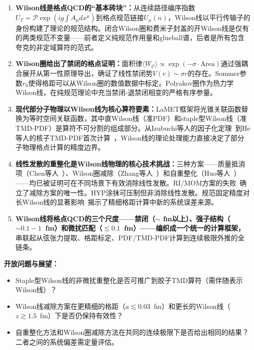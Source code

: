 \documentclass[12pt,a4paper]{ctexart}
\theoremstyle{definition}
\begin{document}
\begin{enumerate}[leftmargin=*]

    \item \textbf{Wilson线是格点QCD的``基本砖块''：}从连续路径编序指数$U_\Gamma = \mathcal{P}\exp(ig\int A_\mu dx^\mu)$到格点规范链接$U_\mu(n)$，Wilson线以平行传输子的身份构建了理论的规范结构。闭合Wilson圈和费米子封盖的开Wilson线是仅有的两类规范不变量——前者定义纯规范作用量和glueball谱，后者是所有包含夸克的非定域算符的范式。

    \item \textbf{Wilson圈给出了禁闭的格点证明：}面积律$\langle W_{\mathcal{C}}\rangle \propto \exp(-\sigma\cdot\text{Area})$通过强耦合展开从第一性原理导出，确证了线性禁闭势$V(r) \sim \sigma r$的存在。Sommer参数$r_0$使得格距可以从Wilson圈的数值数据中标定。Polyakov圈作为热力学Wilson线，在纯规范理论中充当禁闭-退禁闭相变的严格有序参量。

    \item \textbf{现代部分子物理以Wilson线为核心算符要素：}LaMET框架将光锥关联函数替换为等时空间关联函数，其中直Wilson线（准PDF）和staple型Wilson线（准TMD-PDF）是算符不可分割的组成部分。从Izubuchi等人的因子化定理~\cite{Izubuchi2018}到He等人的核子TMD-PDF首次计算~\cite{He2024unpolTMD}，Wilson线的理论处理能力直接决定了部分子物理格点计算的精度边界。

    \item \textbf{线性发散的重整化是Wilson线物理的核心技术挑战：}三种方案——质量抵消项（Chen等人~\cite{Chen2018WLrenorm}）、Wilson圈减除（Zhang等人~\cite{Zhang2022renormTMD}）和自重整化（Huo等人~\cite{Huo2021self}）——均已被证明可在不同场景下有效消除线性发散。RI/MOM方案的失败~\cite{Zhang2022renormTMD,Huo2021self}确立了减除方案的唯一性。HYP涂抹可压制但非消除线性发散。规范固定精度对长Wilson线的显著影响~\cite{Zhang2024gauge_fixing}揭示了精细格距计算中新的系统误差来源。

    \item \textbf{Wilson线将格点QCD的三个尺度——禁闭（$\sim$ fm以上）、强子结构（$\sim 0.1-1$~fm）和微扰匹配（$\lesssim 0.1$~fm）——编织成一个统一的计算框架，}串联起从弦张力提取、格距标定、PDF/TMD-PDF计算到连续极限外推的全链条。

\end{enumerate}

\textbf{开放问题与展望：}
\begin{itemize}
    \item Staple型Wilson线的非微扰重整化是否可推广到胶子TMD算符（需伴随表示Wilson线）？
    \item Wilson线减除方案在更精细的格距（$a \lesssim 0.03$~fm）和更长的Wilson线（$z \gtrsim 1.5$~fm）下是否仍保持有效性？
    \item 自重整化方法和Wilson圈减除方法在共同的连续极限下是否给出相同的结果？二者之间的系统偏差需定量评估。
\end{itemize}
\end{document}
